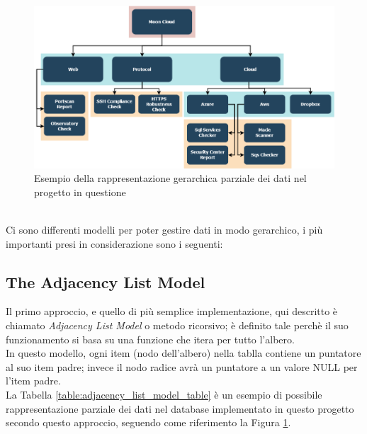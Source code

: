 \begin{figure}[ht!]
	\centering
	\includegraphics[scale=0.49]{images/MC_Rec_Tree.png}
	\caption{Esempio della rappresentazione gerarchica parziale dei dati nel progetto in questione}
	\label{fig:MC_Rec_Tree}
\end{figure}
\ \\
Ci sono differenti modelli per poter gestire dati in modo gerarchico, i più importanti  presi in considerazione sono i seguenti:

\subsection{The Adjacency List Model}
Il primo approccio, e quello di più semplice implementazione, qui descritto è chiamato \textit{Adjacency List Model} o metodo ricorsivo;
è definito tale perchè il suo funzionamento si basa su una funzione che itera per tutto l'albero.\\
In questo modello, ogni item (nodo dell'albero) nella tablla contiene un puntatore al suo item padre; invece il nodo radice avrà un 
puntatore a un valore NULL per l'item padre.\\
La Tabella \ref{table:adjacency_list_model_table} è un esempio di possibile rappresentazione parziale dei dati nel database implementato 
in questo progetto secondo questo approccio, seguendo come riferimento la Figura \ref{fig:MC_Rec_Tree}.
 
